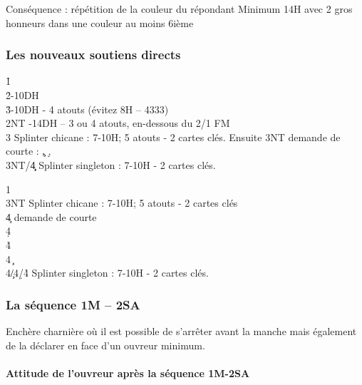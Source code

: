 \documentclass[a4paper]{article}
\begin{document}
Conséquence : répétition de la couleur du répondant
Minimum 14H avec 2 gros honneurs dans une couleur au moins 6ième

\subsubsection{Les nouveaux soutiens directs}

\begin{bidtable}
1\h\+\\
2\h {}-10DH\\
3\h {}-10DH - 4 atouts (évitez 8H – 4333)\\
2NT -14DH – 3 ou 4 atouts, en-dessous du 2/1 FM\\
3\s \> Splinter chicane : 7-10H; 5 atouts - 2 cartes clés. Ensuite 3NT demande de courte : \c , \d , \s \\
3NT/4\c\d \> Splinter singleton : 7-10H - 2 cartes clés.\-
\end{bidtable}

\begin{bidtable}
1\s\+\\
3NT \> Splinter chicane : 7-10H; 5 atouts - 2 cartes clés\+\\
4\c \> demande de courte\+\\
4\d \> \d \\
4\h \> \h \\
4\s \> \c \-\-\\
4\c/4\d/4\h \> Splinter singleton : 7-10H - 2 cartes clés.\-
\end{bidtable}

\subsubsection{La séquence 1M – 2SA}

Enchère charnière où il est possible de s’arrêter avant la manche mais également de la déclarer en 
face d’un ouvreur minimum.

\paragraph{Attitude de l’ouvreur après la séquence 1M-2SA}
\end{document}
